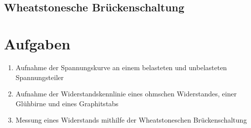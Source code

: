 \documentclass[a4paper,german,12pt,smallheadings]{scrartcl}
\begin{document}

\subsection{Wheatstonesche Brückenschaltung}

\section{Aufgaben}

\begin{enumerate}
  \item Aufnahme der Spannungskurve an einem belasteten und unbelasteten Spannungsteiler
  \item Aufnahme der Widerstandskennlinie eines ohmschen Widerstandes, einer Glühbirne und eines Graphitstabs
  \item Messung eines Widerstands mithilfe der Wheatstoneschen Brückenschaltung
\end{enumerate}
\end{document}
